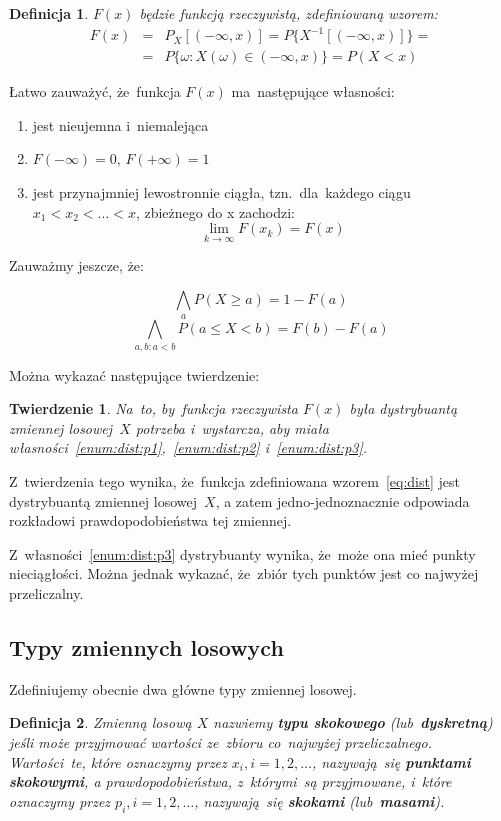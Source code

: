 \documentclass[10pt,a4paper]{article}
\newtheorem{definition}{Definicja}[section]
\newtheorem{theorem}{Twierdzenie}[section]
\begin{document}
\begin{definition}
  $F(x)$ będzie funkcją rzeczywistą, zdefiniowaną wzorem:
  \begin{eqnarray}
    \label{eq:dist}
    F(x) & = & P_X[(-\infty, x)] = P\{X^{-1}[(-\infty, x)]\} =
    \nonumber \\
    & = &  P\{\omega: X(\omega)\in(-\infty,x)\} = P(X<x)
  \end{eqnarray}
\end{definition}

Łatwo zauważyć, że~funkcja $F(x)$ ma~następujące własności:

\begin{enumerate}
  \item \label{enum:dist:p1} jest nieujemna i~niemalejąca
  \item \label{enum:dist:p2} $F(-\infty) = 0$, $F(+\infty) = 1$
  \item \label{enum:dist:p3} jest przynajmniej lewostronnie ciągła,
    tzn.~dla~każdego ciągu $x_1<x_2<\dotsc<x$, zbieżnego do x zachodzi:
    \[
      \lim_{k\rightarrow\infty}F(x_k) = F(x)
    \]
\end{enumerate}

Zauważmy jeszcze, że:

\[
  \bigwedge_a P(X\geq a) = 1 - F(a)
\]
\[
  \bigwedge_{a,b: a<b} P(a\leq X<b) = F(b) - F(a)
\]

Można wykazać następujące twierdzenie:

\begin{theorem}
  Na~to, by~funkcja rzeczywista $F(x)$ była dystrybuantą zmiennej losowej~$X$
  potrzeba i~wystarcza, aby miała własności~\ref{enum:dist:p1},~\ref{enum:dist:p2}
  i~\ref{enum:dist:p3}.
\end{theorem}

Z~twierdzenia tego wynika, że~funkcja zdefiniowana wzorem~\ref{eq:dist} jest
dystrybuantą zmiennej losowej~$X$, a zatem jedno-jednoznacznie odpowiada
rozkładowi prawdopodobieństwa tej zmiennej.

Z~własności~\ref{enum:dist:p3} dystrybuanty wynika, że~może ona mieć punkty
nieciągłości. Można jednak wykazać, że~zbiór tych punktów jest co najwyżej
przeliczalny.

\subsection{Typy zmiennych losowych}
Zdefiniujemy obecnie dwa główne typy zmiennej losowej.

\begin{definition}
  Zmienną losową $X$ nazwiemy \textbf{typu skokowego} (lub~\textbf{dyskretną})
  jeśli może przyjmować wartości ze~zbioru co~najwyżej przeliczalnego.
  Wartości~te, które oznaczymy przez $x_i, i=1,2,\dotsc$, nazywają~się
  \textbf{punktami skokowymi}, a prawdopodobieństwa, z~którymi~są przyjmowane,
  i~które oznaczymy przez $p_i, i=1,2,\dotsc$, nazywają~się \textbf{skokami}
  (lub~\textbf{masami}).
\end{definition}
\end{document}
